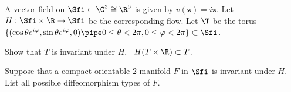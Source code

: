 A vector field on $\Sfi\subset \C^3\cong \R^6$ is given by
$v(\mathbf{z})=i\mathbf{z}$. Let $H:\Sfi\times \R \rightarrow \Sfi$ be
the corresponding flow. Let $\T$ be the torus $\{(\cos \theta
e^{i\varphi},\sin \theta e^{i\varphi},0)\pipe 0\leq \theta<2 \pi,0\leq
\varphi<2\pi\}\subset \Sfi$.
\begin{alist}
\item Show that $T$ is invariant under $H$, \ie\ $H(T\times \R)\subset
T$.
\item Suppose that a compact orientable $2$-manifold $F$ in $\Sfi$ is
invariant under $H$. List all possible diffeomorphism types of $F$. 
\end{alist}
